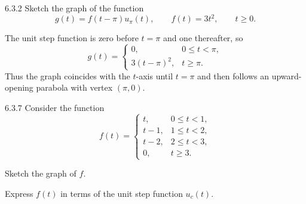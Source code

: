 \documentclass[11pt,oneside]{article}
\begin{document}
\begin{problem}{6.3.2}
Sketch the graph of the function
\[
    g(t)=f(t-\pi)u_\pi(t),
    \qquad f(t)=3t^2,
    \qquad t\geq0.
\]
\end{problem}

\begin{solution}
The unit step function is zero before $t=\pi$ and one thereafter, so
\[
    g(t)=
    \begin{cases}
        0, & 0\leq t<\pi,\\
        3(t-\pi)^2, & t\geq\pi.
    \end{cases}
\]
Thus the graph coincides with the $t$-axis until $t=\pi$ and then follows an upward-opening parabola with vertex $(\pi, 0)$.
\begin{center}
\end{center}
\end{solution}

\begin{problem}{6.3.7}
Consider the function
\[
    f(t)=
    \begin{cases}
        t, & 0\leq t<1,\\
        t-1, & 1\leq t<2,\\
        t-2, & 2\leq t<3,\\
        0, & t\geq3.
    \end{cases}
\]
\begin{problemsubparts}
    \item Sketch the graph of $f$.
    \item Express $f(t)$ in terms of the unit step function $u_c(t)$.
\end{problemsubparts}
\end{problem}
\end{document}
